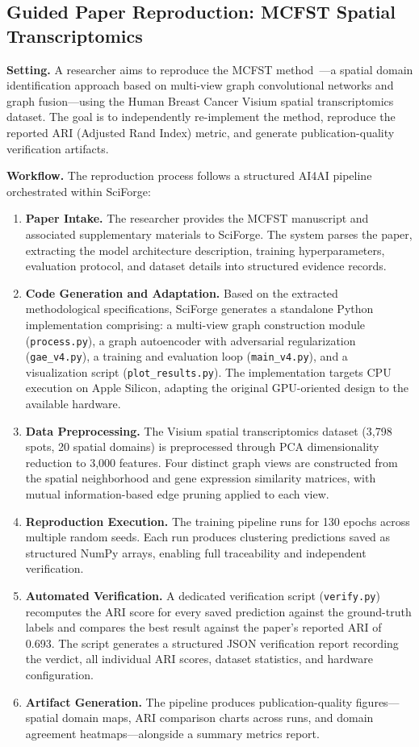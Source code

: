 \documentclass[sn-basic,Numbered,pdflatex]{sn-jnl}
\begin{document}
\FloatBarrier
\subsection{Guided Paper Reproduction: MCFST Spatial Transcriptomics}

\textbf{Setting.} A researcher aims to reproduce the MCFST method~\cite{MCFST2025}---a spatial domain identification approach based on multi-view graph convolutional networks and graph fusion---using the Human Breast Cancer Visium spatial transcriptomics dataset. The goal is to independently re-implement the method, reproduce the reported ARI (Adjusted Rand Index) metric, and generate publication-quality verification artifacts.

\textbf{Workflow.} The reproduction process follows a structured AI4AI pipeline orchestrated within SciForge:
\begin{enumerate}
    \item \textbf{Paper Intake.} The researcher provides the MCFST manuscript and associated supplementary materials to SciForge. The system parses the paper, extracting the model architecture description, training hyperparameters, evaluation protocol, and dataset details into structured evidence records.
    \item \textbf{Code Generation and Adaptation.} Based on the extracted methodological specifications, SciForge generates a standalone Python implementation comprising: a multi-view graph construction module (\texttt{process.py}), a graph autoencoder with adversarial regularization (\texttt{gae\_v4.py}), a training and evaluation loop (\texttt{main\_v4.py}), and a visualization script (\texttt{plot\_results.py}). The implementation targets CPU execution on Apple Silicon, adapting the original GPU-oriented design to the available hardware.
    \item \textbf{Data Preprocessing.} The Visium spatial transcriptomics dataset (3,798 spots, 20 spatial domains) is preprocessed through PCA dimensionality reduction to 3,000 features. Four distinct graph views are constructed from the spatial neighborhood and gene expression similarity matrices, with mutual information-based edge pruning applied to each view.
    \item \textbf{Reproduction Execution.} The training pipeline runs for 130 epochs across multiple random seeds. Each run produces clustering predictions saved as structured NumPy arrays, enabling full traceability and independent verification.
    \item \textbf{Automated Verification.} A dedicated verification script (\texttt{verify.py}) recomputes the ARI score for every saved prediction against the ground-truth labels and compares the best result against the paper's reported ARI of 0.693. The script generates a structured JSON verification report recording the verdict, all individual ARI scores, dataset statistics, and hardware configuration.
    \item \textbf{Artifact Generation.} The pipeline produces publication-quality figures---spatial domain maps, ARI comparison charts across runs, and domain agreement heatmaps---alongside a summary metrics report.
\end{enumerate}
\end{document}
